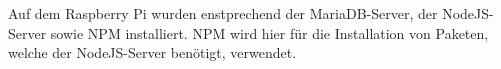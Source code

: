 Auf dem Raspberry Pi wurden enstprechend der MariaDB-Server, der NodeJS-Server sowie NPM installiert. NPM wird hier für die Installation von Paketen, welche der NodeJS-Server benötigt, verwendet.